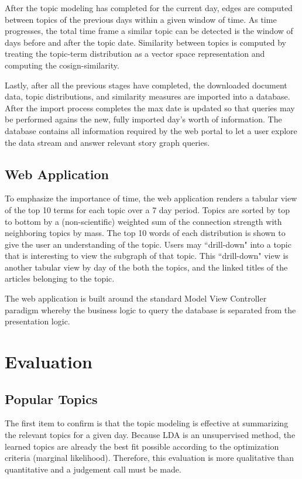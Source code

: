\documentclass[10pt]{article}
\begin{document}
After the topic modeling has completed for the current day, edges are computed between topics of the previous days within a given window of time.  As time progresses, the total time frame a similar topic can be detected is the window of days before and after the topic date.  Similarity between topics is computed by treating the topic-term distribution as a vector space representation and computing the cosign-similarity.  

Lastly, after all the previous stages have completed, the downloaded document data, topic distributions, and similarity measures are imported into a database.  After the import process completes the max date is updated so that queries may be performed agains the new, fully imported day's worth of information.  The database contains all information required by the web portal to let a user explore the data stream and answer relevant story graph queries.

\subsection {Web Application}
To emphasize the importance of time, the web application renders a tabular view of the top 10 terms for each topic over a 7 day period.  Topics are sorted by top to bottom by a (non-scientific) weighted sum of the connection strength with neighboring topics by mass.  The top 10 words of each distribution is shown to give the user an understanding of the topic.  Users may ``drill-down" into a topic that is interesting to view the subgraph of that topic.  This ``drill-down" view is another tabular view by day of the both the topics, and the linked titles of the articles belonging to the topic.

 
The web application is built around the standard Model View Controller paradigm whereby the business logic to query the database is separated from the presentation logic.

\section {Evaluation}

\subsection {Popular Topics}
The first item to confirm is that the topic modeling is effective at summarizing the relevant topics for a given day. Because LDA is an unsupervised method, the learned topics are already the best fit possible according to the optimization criteria (marginal likelihood).  Therefore, this evaluation is more qualitative than quantitative and a judgement call must be made.
\end{document}
